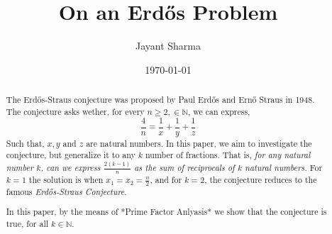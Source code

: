 \documentclass[9pt]{amsart}
\title{\textbf{On an Erdős Problem}}
\author{Jayant Sharma}
\date{\today}
\theoremstyle{plain}
\begin{document}
\maketitle
\begin{abstract}
The Erdős-Straus conjecture was proposed by Paul Erdős and Ernő Straus in 1948. The conjecture asks wether, for every $n\geq 2, \in \mathbb{N}$, we can express,
\[
\frac{4}{n} = \frac{1}{x} + \frac{1}{y} + \frac{1}{z}
\]
Such that, $x, y$ and $z$ are natural numbers.
In this paper, we aim to investigate the conjecture, but generalize it to any $k$ number of fractions. That is, \emph{for any natural number $k$, can we express $\frac{2(k-1)}{n}$ as the sum of reciprocals of $k$ natural numbers.}
For $k=1$ the solution is when $x_1 = x_2 = \frac{n}{2}$, and for $k=2$, the conjecture reduces to the famous \emph{Erdős-Straus Conjecture}. 

In this paper, by the means of *Prime Factor Anlyasis* we show that the conjecture is true, for all $k \in \mathbb{N}$.
\end{abstract}
\tableofcontents

\nocite{*}





\end{document}
